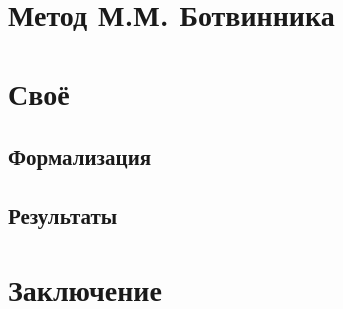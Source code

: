 \documentclass{beamer}
\begin{document}
\section{Метод М.М. Ботвинника}


\section{Своё}
\subsection{Формализация}


\subsection{Результаты}


\section{Заключение}

\end{document}
